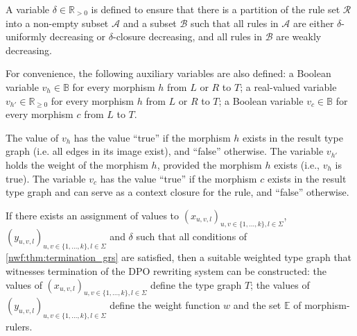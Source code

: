 A variable $\delta \in \mathbb{R}_{>0}$ is defined to ensure that there is
a partition of the rule set $\mathcal{R}$ into a non-empty subset $\mathcal{A}$ and a subset $\mathcal{B}$ such that all rules in $\mathcal{A}$ are either $\delta$-uniformly decreasing or $\delta$-closure decreasing, and all rules in $\mathcal{B}$ are weakly decreasing.

For convenience, the following auxiliary variables are also defined: a Boolean variable $v_h \in \mathbb{B}$ for every morphism $h$ from $L$ or $R$ to $T$; a real-valued variable $v_{h'} \in \mathbb{R}_{\geq 0}$ for every morphism $h$ from $L$ or $R$ to $T$; a Boolean variable $v_c \in \mathbb{B}$ for every morphism $c$ from $L$ to $T$.

The value of $v_h$ has the value \enquote{true} if the morphism $h$ exists in the result type graph (i.e. all edges in its image exist), and \enquote{false} otherwise.
The variable $v_{h'}$ holds the weight of the morphism $h$, provided the morphism $h$ exists (i.e., $v_h$ is true).
The variable $v_c$ has the value \enquote{true} if the morphism $c$ exists in the result type graph and can serve as a context closure for the rule, and \enquote{false} otherwise.

If there exists an assignment of values to \( (x_{u,v,l})_{u,v \in \{1,...,k\}, l \in \Sigma} \), \( (y_{u,v,l})_{u,v \in \{1,...,k\}, l \in \Sigma} \) and $\delta$ such that all conditions of \autoref{nwf:thm:termination_grs} are satisfied, then a suitable weighted type graph that witnesses termination of the DPO rewriting system can be constructed: the values of \( (x_{u,v,l})_{u,v \in \{1,...,k\}, l \in \Sigma} \) define the type graph $T$; the values of \( (y_{u,v,l})_{u,v \in \{1,...,k\}, l \in \Sigma} \) define the weight function $w$ and the set $\mathbb{E}$ of morphism-rulers.     